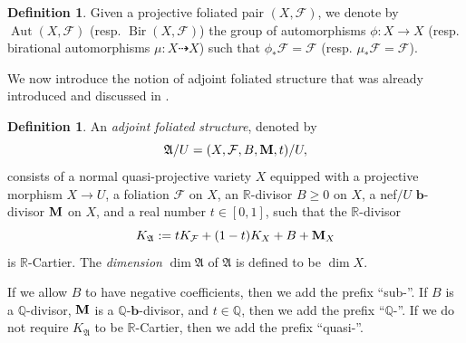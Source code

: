 \documentclass[11pt,reqno]{amsart}
\numberwithin{equation}{section}
\newcommand{\bb}{\bm{b}}
\newcommand{\Mm}{{\bf{M}}}
\newcommand{\Qq}{\mathbb{Q}}
\newcommand{\Rr}{\mathbb{R}}
\newcommand{\Bir}{\operatorname{Bir}}
\newcommand{\Aut}{\operatorname{Aut}}
\newcommand{\Aa}{{\mathfrak{A}}}
\newcommand{\Ff}{\mathcal{F}}
\theoremstyle{definition}
\newtheorem{defn}[thm]{Definition}
\begin{document}
\begin{defn}
Given a projective foliated pair $(X,\Ff)$, we denote by $\Aut(X,\Ff)$ (resp. $\Bir(X,\Ff)$) the group of automorphisms $\phi\colon X\to X$ (resp. birational automorphisms $\mu\colon X\dashrightarrow X$) such that $\phi_\ast\Ff=\Ff$ (resp. $\mu_\ast\Ff=\Ff$).
\end{defn}

We now introduce the notion of adjoint foliated structure that was already introduced and discussed in 
\cite{Cas+24,Cas+25a}.

\begin{defn}\label{defn: afs}
An \emph{adjoint foliated structure}, denoted by
\[
\Aa/U=(X,\Ff,B,\Mm,t)/U,
\]
consists of a normal quasi-projective variety $X$ equipped with a projective morphism $X\to U$, a foliation $\Ff$ on $X$, an $\Rr$-divisor $B\geq 0$ on $X$, a nef$/U$ $\bb$-divisor $\Mm$ on $X$, and a real number $t\in [0,1]$, such that the $\Rr$-divisor
\[
K_{\Aa}:=tK_{\Ff}+(1-t)K_X+B+\Mm_X
\]
is $\Rr$-Cartier. The \emph{dimension} $\dim\Aa$ of $\Aa$ is defined to be $\dim X$.

If we allow $B$ to have negative coefficients, then we add the prefix ``sub-''. If $B$ is a $\Qq$-divisor, $\Mm$ is a $\Qq$-$\bb$-divisor, and $t\in\mathbb Q$, then we add the prefix ``$\Qq$-''. If we do not require $K_{\Aa}$ to be $\Rr$-Cartier, then we add the prefix ``quasi-''.
\end{defn}
\end{document}
